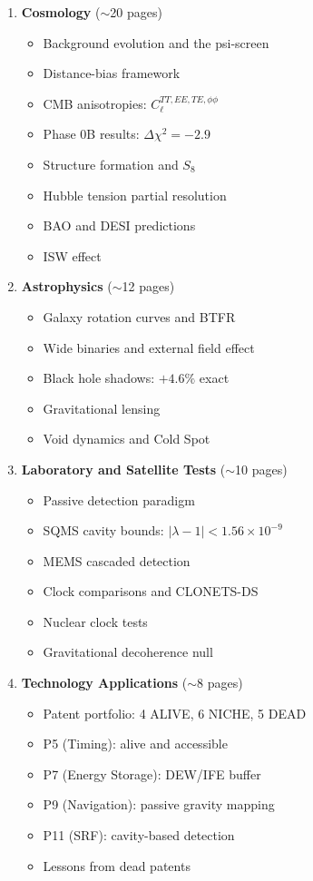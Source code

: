 \documentclass[11pt,a4paper]{article}
\begin{document}
\begin{enumerate}[label=\Roman*.]
\item \textbf{Cosmology} ($\sim$20 pages)
\begin{itemize}
\item Background evolution and the psi-screen
\item Distance-bias framework
\item CMB anisotropies: $C_\ell^{TT,EE,TE,\phi\phi}$
\item Phase 0B results: $\Delta\chi^2 = -2.9$
\item Structure formation and $S_8$
\item Hubble tension partial resolution
\item BAO and DESI predictions
\item ISW effect
\end{itemize}

\item \textbf{Astrophysics} ($\sim$12 pages)
\begin{itemize}
\item Galaxy rotation curves and BTFR
\item Wide binaries and external field effect
\item Black hole shadows: $+4.6\%$ exact
\item Gravitational lensing
\item Void dynamics and Cold Spot
\end{itemize}

\item \textbf{Laboratory and Satellite Tests} ($\sim$10 pages)
\begin{itemize}
\item Passive detection paradigm
\item SQMS cavity bounds: $|\lambda - 1| < 1.56 \times 10^{-9}$
\item MEMS cascaded detection
\item Clock comparisons and CLONETS-DS
\item Nuclear clock tests
\item Gravitational decoherence null
\end{itemize}

\item \textbf{Technology Applications} ($\sim$8 pages)
\begin{itemize}
\item Patent portfolio: 4 ALIVE, 6 NICHE, 5 DEAD
\item P5 (Timing): alive and accessible
\item P7 (Energy Storage): DEW/IFE buffer
\item P9 (Navigation): passive gravity mapping
\item P11 (SRF): cavity-based detection
\item Lessons from dead patents
\end{itemize}


\end{enumerate}
\end{document}
